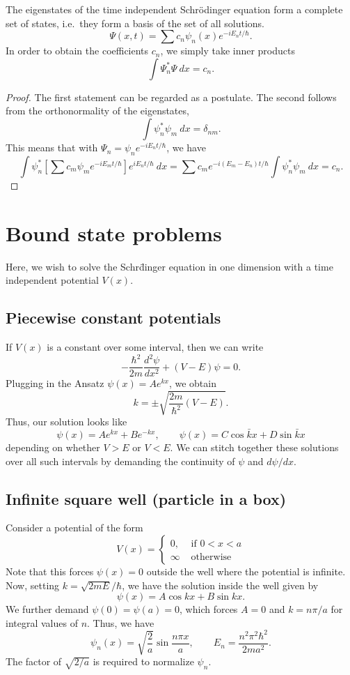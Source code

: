 \documentclass[11pt]{article}
\newcommand\dd[3][]{\frac{d^{#1}{#2}}{d {#3}^{#1}}}
\theoremstyle{definition}
\theoremstyle{remark}
\numberwithin{equation}{section}
\begin{document}
    \begin{theorem}
        The eigenstates of the time independent Schr\"odinger equation form a
        complete set of states, i.e.\ they form a basis of the set of all
        solutions. \[
            \Psi(x, t) = \sum c_n \psi_n(x) e^{-i E_n t/\hbar}.
        \] In order to obtain the coefficients $c_n$, we simply take inner products
        \[
            \int \Psi_n^*\Psi\:dx = c_n.
        \] 
    \end{theorem}
    \begin{proof}
        The first statement can be regarded as a postulate. The second follows from
        the orthonormality of the eigenstates, \[
            \int \psi_n^*\psi_m\:dx = \delta_{nm}.
        \] This means that with $\Psi_n = \psi_n e^{-iE_n t / \hbar}$, we have \[
            \int \psi_n^* \left[\sum c_m\psi_m e^{-i E_m t /\hbar}\right]e^{i E_n t
            / \hbar}\:dx = 
            \sum c_me^{-i (E_m - E_n) t / \hbar}\int \psi_n^*\psi_m\:dx = c_n.
        \] 
    \end{proof}


    \section{Bound state problems}
    Here, we wish to solve the Schr\"dinger equation in one dimension with a time
    independent potential $V(x)$.

    \subsection{Piecewise constant potentials}
    If $V(x)$ is a constant over some interval, then we can write \[
        -\frac{\hbar^2}{2m}\dd[2]{\psi}{x} + (V - E)\psi = 0.
    \] Plugging in the Ansatz $\psi(x) = Ae^{kx}$, we obtain \[
        k = \pm\sqrt{\frac{2m}{\hbar^2}(V - E)}.
    \] Thus, our solution looks like \[
        \psi(x) = Ae^{kx} + Be^{-kx}, \qquad 
        \psi(x) = C\cos{\bar{k}x} + D\sin{\bar{k}x}
    \] depending on whether $V > E$ or $V < E$.
    We can stitch together these solutions over all such intervals by demanding the
    continuity of $\psi$ and $d\psi /dx$.

    \subsection{Infinite square well (particle in a box)}
    Consider a potential of the form \[
        V(x) = \begin{cases}
            0, &\text{ if }0 < x < a \\
            \infty &\text{ otherwise }
        \end{cases}
    \] Note that this forces $\psi(x) = 0$ outside the well where the potential is
    infinite. Now, setting $k = \sqrt{2mE} / \hbar$, we have the solution inside the
    well given by \[
        \psi(x) = A\cos{kx} + B\sin{kx}.
    \] We further demand $\psi(0) = \psi(a) = 0$, which forces $A = 0$ and $k = n\pi
    /a$ for integral values of $n$. Thus, we have \[
        \psi_n(x) = \sqrt{\frac{2}{a}}\sin{\frac{n\pi x}{a}}, \qquad
        E_n = \frac{n^2\pi^2\hbar^2}{2ma^2}.
    \] The factor of $\sqrt{2 / a}$ is required to normalize $\psi_n$.
    
    
\end{document}
